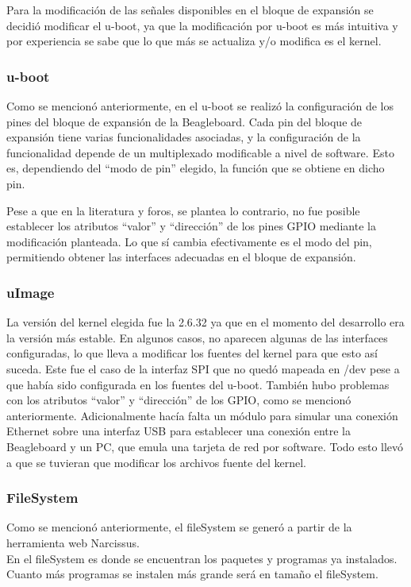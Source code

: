 \documentclass[%
        final,
        notitlepage,
        narroweqnarray,
        inline,
        ]{ieee}
\begin{document}
Para la modificación de las señales disponibles en el bloque de expansión se decidió modificar el u-boot, ya que la modificación por u-boot es más intuitiva y por experiencia se sabe que lo que más se actualiza y/o modifica es el kernel. 

\subsubsection{u-boot}
Como se mencionó anteriormente, en el u-boot se realizó la configuración de los pines del bloque de expansión de la Beagleboard. 
Cada pin del bloque de expansión tiene varias funcionalidades asociadas, y la configuración de la 
funcionalidad depende de un multiplexado modificable a nivel de software. Esto es, dependiendo del “modo de pin” elegido, la función que se obtiene en dicho pin.

Pese a que en la literatura y foros, se plantea lo contrario, no fue posible establecer los atributos “valor” y “dirección” de los pines GPIO mediante la modificación planteada. Lo que sí cambia efectivamente es el modo del pin, permitiendo obtener las interfaces adecuadas en el bloque de expansión.

\subsubsection{uImage}
La versión del kernel elegida fue la 2.6.32 ya que en el momento del desarrollo era la versión más estable.
En algunos casos, no aparecen algunas de las interfaces configuradas, lo que lleva a modificar los fuentes del kernel para que esto así suceda. Este fue el caso de la interfaz SPI que no quedó mapeada en /dev pese a que había sido configurada en los fuentes del u-boot. También hubo problemas con los atributos “valor” y “dirección” de los GPIO, como se mencionó anteriormente. Adicionalmente hacía falta un módulo para simular una conexión Ethernet sobre una interfaz USB para establecer una conexión entre la Beagleboard y un PC, que emula una tarjeta de red por software.
Todo esto llevó a que se tuvieran que modificar los archivos fuente del kernel.

\subsubsection{FileSystem}

Como se mencionó anteriormente, el fileSystem se generó a partir de la herramienta web Narcissus.\\
En el fileSystem es donde se encuentran los paquetes y programas ya instalados. Cuanto más programas se instalen más grande será en tamaño el fileSystem.
\end{document}
